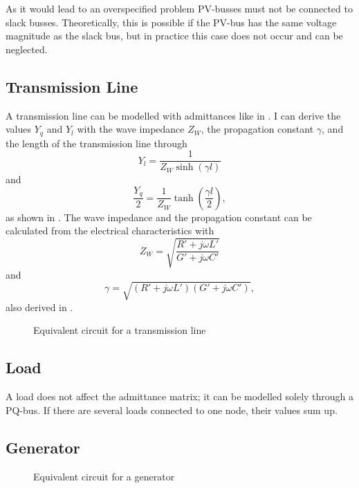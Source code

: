 As it would lead to an overspecified problem PV-busses must not be connected to slack busses. Theoretically, this is possible if the PV-bus has the same voltage magnitude as the slack bus, but in practice this case does not occur and can be neglected.

\subsection{Transmission Line}
A transmission line can be modelled with admittances like in . I can derive the values $Y_q$ and $Y_l$ with the wave impedance $Z_W$, the propagation constant $\gamma$, and the length of the transmission line through
\begin{equation}
	Y_l = \frac{1}{Z_W \sinh \left( \gamma l \right)}
\end{equation}
and
\begin{equation}
	\frac{Y_q}{2} = \frac{1}{Z_W} \tanh \left( \frac{\gamma l}{2} \right),
\end{equation}
as shown in \citep[p. 155]{powerSystemAnalysis}. The wave impedance and the propagation constant can be calculated from the electrical characteristics with
\begin{equation}
	Z_W = \sqrt{\frac{R' + j \omega L'}{G' + j \omega C'}}
\end{equation}
and 
\begin{equation}
	\gamma = \sqrt{\left( R' + j \omega L' \right) \left( G' + j \omega C' \right)},
\end{equation}
also derived in \citep[p. 153]{powerSystemAnalysis}.

\begin{figure}
	\centering
	
	\caption{Equivalent circuit for a transmission line}
	\label{fig:transmission_line}
\end{figure}

\subsection{Load}
A load does not affect the admittance matrix; it can be modelled solely through a PQ-bus. If there are several loads connected to one node, their values sum up.

\subsection{Generator}

\begin{figure}
	\centering
	
	\caption{Equivalent circuit for a generator}
	\label{fig:generator}
\end{figure}

